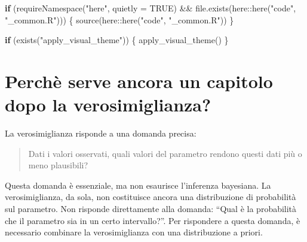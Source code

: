\documentclass[
  italian,
  letterpaper,
  a4paper,
  11pt,
  open=any]{scrbook}
\newenvironment{Shaded}{\begin{snugshade}}{\end{snugshade}}
\newcommand{\AttributeTok}[1]{\textcolor[rgb]{0.40,0.45,0.13}{#1}}
\newcommand{\ConstantTok}[1]{\textcolor[rgb]{0.56,0.35,0.01}{#1}}
\newcommand{\ControlFlowTok}[1]{\textcolor[rgb]{0.00,0.23,0.31}{\textbf{#1}}}
\newcommand{\FunctionTok}[1]{\textcolor[rgb]{0.28,0.35,0.67}{#1}}
\newcommand{\NormalTok}[1]{\textcolor[rgb]{0.00,0.23,0.31}{#1}}
\newcommand{\SpecialCharTok}[1]{\textcolor[rgb]{0.37,0.37,0.37}{#1}}
\newcommand{\StringTok}[1]{\textcolor[rgb]{0.13,0.47,0.30}{#1}}
\theoremstyle{plain}
\theoremstyle{definition}
\theoremstyle{definition}
\theoremstyle{remark}
\begin{document}
\begin{tcolorbox}[enhanced jigsaw, arc=.35mm, bottomrule=.15mm, bottomtitle=1mm, breakable, colback=white, colbacktitle=quarto-callout-caution-color!10!white, colframe=quarto-callout-caution-color-frame, coltitle=black, left=2mm, leftrule=.75mm, opacityback=0, opacitybacktitle=0.6, rightrule=.15mm, title=\textcolor{quarto-callout-caution-color}{\faFire}\hspace{0.5em}{Preparazione del Notebook}, titlerule=0mm, toprule=.15mm, toptitle=1mm]

\begin{Shaded}
\begin{Highlighting}[]
\ControlFlowTok{if}\NormalTok{ (}\FunctionTok{requireNamespace}\NormalTok{(}\StringTok{"here"}\NormalTok{, }\AttributeTok{quietly =} \ConstantTok{TRUE}\NormalTok{) }\SpecialCharTok{\&\&}
    \FunctionTok{file.exists}\NormalTok{(here}\SpecialCharTok{::}\FunctionTok{here}\NormalTok{(}\StringTok{"code"}\NormalTok{, }\StringTok{"\_common.R"}\NormalTok{))) \{}
  \FunctionTok{source}\NormalTok{(here}\SpecialCharTok{::}\FunctionTok{here}\NormalTok{(}\StringTok{"code"}\NormalTok{, }\StringTok{"\_common.R"}\NormalTok{))}
\NormalTok{\}}

\ControlFlowTok{if}\NormalTok{ (}\FunctionTok{exists}\NormalTok{(}\StringTok{"apply\_visual\_theme"}\NormalTok{)) \{}
  \FunctionTok{apply\_visual\_theme}\NormalTok{()}
\NormalTok{\}}
\end{Highlighting}
\end{Shaded}

\end{tcolorbox}

\section{Perchè serve ancora un capitolo dopo la
verosimiglianza?}\label{sec-why-posterior-after-likelihood}

La verosimiglianza risponde a una domanda precisa:

\begin{quote}
Dati i valori osservati, quali valori del parametro rendono questi dati
più o meno plausibili?
\end{quote}

Questa domanda è essenziale, ma non esaurisce l'inferenza bayesiana. La
verosimiglianza, da sola, non costituisce ancora una distribuzione di
probabilità sul parametro. Non risponde direttamente alla domanda:
``Qual è la probabilità che il parametro sia in un certo intervallo?''.
Per rispondere a questa domanda, è necessario combinare la
verosimiglianza con una distribuzione a priori.
\end{document}
